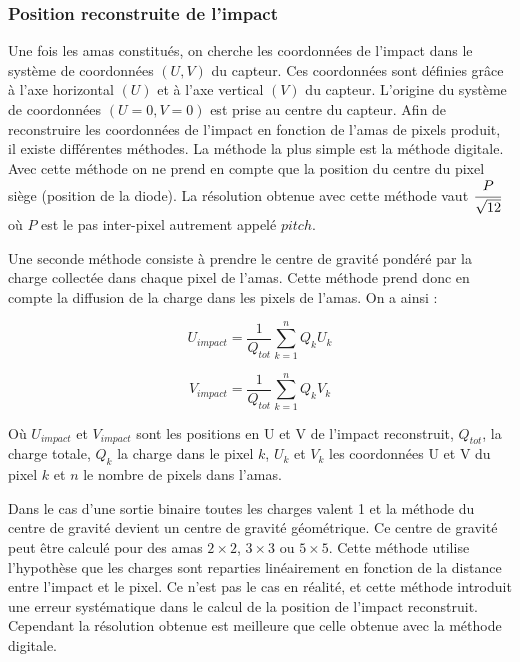    \subsubsection{Position reconstruite de l'impact}
   \label{sect:reso}
   Une fois les amas constitu\'es, on cherche les coordonn\'ees de l'impact dans le syst\`eme de coordonn\'ees $(U,V)$ du capteur. Ces coordonn\'ees sont d\'efinies gr\^ace \`a l'axe horizontal $(U)$ et \`a l'axe vertical $(V)$ du capteur. L'origine du syst\`eme de coordonn\'ees $(U=0,V=0)$ est prise au centre du capteur. Afin de reconstruire les coordonn\'ees de l'impact en fonction de l'amas de pixels produit, il existe diff\'erentes m\'ethodes. La m\'ethode la plus simple est la m\'ethode digitale. Avec cette m\'ethode on ne prend en compte que la position du centre du pixel si\`ege (position de la diode). La r\'esolution obtenue avec cette m\'ethode vaut $\cfrac{P}{\sqrt{12}}$ o\`u $P$ est le pas inter-pixel autrement appel\'e $pitch$.

   \medskip
   
   Une seconde m\'ethode consiste \`a prendre le centre de gravit\'e pond\'er\'e par la charge collect\'ee dans chaque pixel de l'amas. Cette m\'ethode prend donc en compte la diffusion de la charge dans les pixels de l'amas. On a ainsi : 
   
   \begin{equation}
     U_{impact} = \dfrac{1}{Q_{tot}} \sum_{k=1}^n Q_k U_k
   \end{equation}

   \begin{equation}
     V_{impact} = \dfrac{1}{Q_{tot}} \sum_{k=1}^n Q_k V_k
   \end{equation} 
   
   O\`u $U_{impact}$ et $V_{impact}$ sont les positions en U et V de l'impact reconstruit, $Q_{tot}$, la charge totale, $Q_k$ la charge dans le pixel $k$, $U_k$ et $V_k$ les coordonn\'ees U et V du pixel $k$ et $n$ le nombre de pixels dans l'amas.
   
   \medskip
   
   Dans le cas d'une sortie binaire toutes les charges valent 1 et la m\'ethode du centre de gravit\'e devient un centre de gravit\'e g\'eom\'etrique. Ce centre de gravit\'e peut \^etre calcul\'e pour des amas $2 \times 2$, $3 \times 3$ ou $5 \times 5$. Cette m\'ethode utilise l'hypoth\`ese que les charges sont reparties lin\'eairement en fonction de la distance entre l'impact et le pixel. Ce n'est pas le cas en r\'ealit\'e, et cette m\'ethode introduit une erreur systématique dans le calcul de la position de l'impact reconstruit. Cependant la r\'esolution obtenue est meilleure que celle obtenue avec la m\'ethode digitale. 
   

